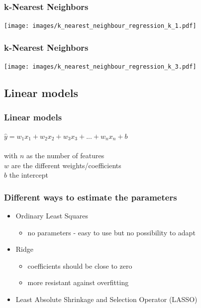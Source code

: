 \documentclass[aspectratio=169]{beamer}
\begin{document}
\begin{frame}
  \frametitle{k-Nearest Neighbors}
  \begin{center}
    \texttt{[image: images/k\_nearest\_neighbour\_regression\_k\_1.pdf]}    
  \end{center}
\end{frame}

\begin{frame}
  \frametitle{k-Nearest Neighbors}
  \begin{center}
    \texttt{[image: images/k\_nearest\_neighbour\_regression\_k\_3.pdf]}
  \end{center}
\end{frame}


\subsection{Linear models}

\setcounter{tocdepth}{2}
\begin{frame}{}
   \tableofcontents[currentsubsection]
\end{frame}


\begin{frame}
  \frametitle{Linear models}
  \begin{block}{}
    \begin{center}
      $\hat{y} = w_{1}x_{1} + w_{2}x_{2} + w_{3}x_{3} + ... + w_{n}x_{n} + b$\\
      \ \\
      with $n$ as the  number of features\\
      $w$ are the different weights/coefficients\\
      $b$ the intercept\\
    \end{center}
  \end{block}  
\end{frame}

\begin{frame}
  \frametitle{Different ways to estimate the parameters}
  \begin{block}{}
    \begin{center}
      \begin{itemize}
      \item Ordinary Least Squares
        \begin{itemize}
        \item no parameters - easy to use but no possibility to adapt
        \end{itemize}
      \item Ridge
        \begin{itemize}
        \item coefficients should be close to zero
        \item more resistant against overfitting
        \end{itemize}    
      \item Least Absolute Shrinkage and Selection Operator (LASSO)
      \end{itemize}
    \end{center}
  \end{block}
\end{frame}
\end{document}

